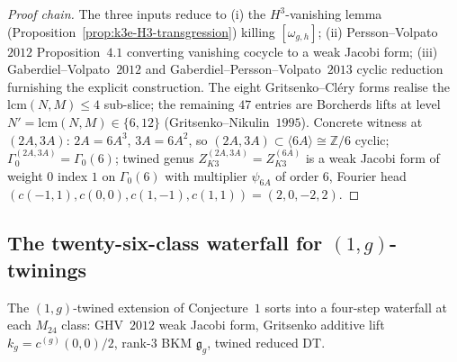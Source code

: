 \begin{proof}[Proof chain]
The three inputs reduce to (i) the $H^3$-vanishing lemma (Proposition~\ref{prop:k3e-H3-transgression}) killing $[\omega_{g, h}]$; (ii) Persson--Volpato~$2012$ Proposition~$4.1$ converting vanishing cocycle to a weak Jacobi form; (iii) Gaberdiel--Volpato~$2012$ and Gaberdiel--Persson--Volpato~$2013$ cyclic reduction furnishing the explicit construction. The eight Gritsenko--Cl\'ery forms realise the $\mathrm{lcm}(N, M) \leq 4$ sub-slice; the remaining $47$ entries are Borcherds lifts at level $N' = \mathrm{lcm}(N, M) \in \{6, 12\}$ (Gritsenko--Nikulin~$1995$). Concrete witness at $(2A, 3A)$: $2A = 6A^3$, $3A = 6A^2$, so $(2A, 3A) \subset \langle 6A \rangle \cong \mathbb{Z}/6$ cyclic; $\Gamma^{(2A, 3A)}_0 = \Gamma_0(6)$; twined genus $Z^{(2A, 3A)}_{K3} = Z^{(6A)}_{K3}$ is a weak Jacobi form of weight $0$ index $1$ on $\Gamma_0(6)$ with multiplier $\psi_{6A}$ of order $6$, Fourier head $(c(-1, 1), c(0, 0), c(1, -1), c(1, 1)) = (2, 0, -2, 2)$.
\end{proof}

\subsection{The twenty-six-class waterfall for \texorpdfstring{$(1, g)$}{(1, g)}-twinings}
\label{subsec:k3e-26class-waterfall}

The $(1, g)$-twined extension of Conjecture~$1$ sorts into a four-step waterfall at each $M_{24}$ class: GHV~$2012$ weak Jacobi form, Gritsenko additive lift $k_g = c^{(g)}(0, 0)/2$, rank-$3$ BKM $\mathfrak{g}_g$, twined reduced DT.

